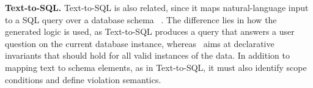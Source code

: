 \smallskip
\noindent\textbf{Text-to-SQL.}
Text-to-SQL is also related, since it maps natural-language input to a SQL query over a database schema~\DIFdelbegin %
\DIFdelend \DIFaddbegin \cite{yu2018spider,picard2021,resdsql2023,pourreza2023din,dail2025,llmTEXT2SQLSurvey2025,redsql2025,XiYanSQL,alrashed2026verification,rabonato2026portuguese}\DIFaddend . The difference lies in \DIFdelbegin {}\DIFdelend how the generated logic is used, as Text-to-SQL produces a query that answers a user question on the current database instance, whereas \system\ aims at declarative invariants that should hold for all valid instances of the data. In addition to mapping text to schema elements, as in Text-to-SQL, it must also identify scope conditions and define violation semantics. %
